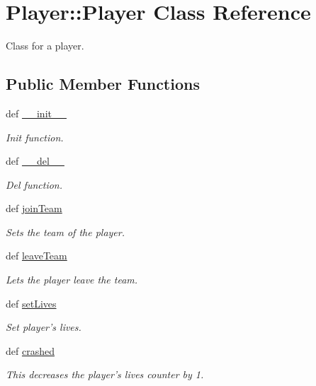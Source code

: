 \hypertarget{class_player_1_1_player}{
\section{\-Player\-:\-:\-Player \-Class \-Reference}
\label{class_player_1_1_player}
}


\-Class for a player.  


\subsection*{\-Public \-Member \-Functions}
\begin{DoxyCompactItemize}
\item 
def \hyperlink{class_player_1_1_player_ae36138eb3e90689a37f25771d4fbe654}{\-\_\-\-\_\-init\-\_\-\-\_\-}
\begin{DoxyCompactList}\small\item\em \-Init function. \end{DoxyCompactList}\item 
def \hyperlink{class_player_1_1_player_a1d9eef196add9d0c61720dd83c35c5a0}{\-\_\-\-\_\-del\-\_\-\-\_\-}
\begin{DoxyCompactList}\small\item\em \-Del function. \end{DoxyCompactList}\item 
def \hyperlink{class_player_1_1_player_a1add952c2d0cd2c4ae65ce3dd04709ad}{join\-Team}
\begin{DoxyCompactList}\small\item\em \-Sets the team of the player. \end{DoxyCompactList}\item 
def \hyperlink{class_player_1_1_player_a7299161f2e3e7a72ac9628b5ccb8d778}{leave\-Team}
\begin{DoxyCompactList}\small\item\em \-Lets the player leave the team. \end{DoxyCompactList}\item 
def \hyperlink{class_player_1_1_player_a2b915a274e71ef7c8a1ccbf341d27a77}{set\-Lives}
\begin{DoxyCompactList}\small\item\em \-Set player's lives. \end{DoxyCompactList}\item 
def \hyperlink{class_player_1_1_player_a4a7a19f7e49e73c398acdc9aafbf7733}{crashed}
\begin{DoxyCompactList}\small\item\em \-This decreases the player's lives counter by 1. \end{DoxyCompactList}\item 

\end{DoxyCompactItemize}
